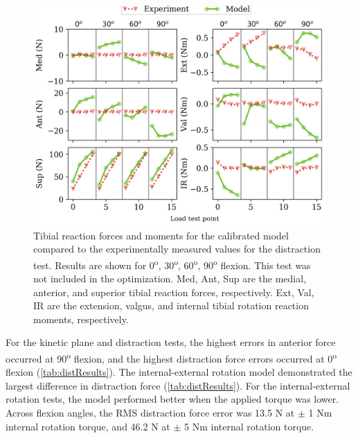 \begin{figure}
    \centering
    \includegraphics[width=0.80\linewidth]{../img/Spec1_Dist_OptimizationResults_APVV_0_30_60_90.png}
    \caption{Tibial reaction forces and moments for the calibrated model compared to the experimentally measured values for the distraction test. Results are shown for 0\textsuperscript{o}, 30\textsuperscript{o}, 60\textsuperscript{o}, 90\textsuperscript{o} flexion. This test was not included in the optimization. Med, Ant, Sup are the medial, anterior, and superior tibial reaction forces, respectively. Ext, Val, IR are the extension, valgus, and internal tibial rotation reaction moments, respectively.}
    \label{fig:resultsDistraction}
\end{figure}

For the kinetic plane and distraction tests, the highest errors in anterior force occurred at 90\textsuperscript{o} flexion, and the highest distraction force errors occurred at 0\textsuperscript{o} flexion (\autoref{tab:distResults}). The internal-external rotation model demonstrated the largest difference in distraction force (\autoref{tab:distResults}). For the internal-external rotation tests, the model performed better when the applied torque was lower. Across flexion angles, the RMS distraction force error was 13.5 N at $\pm$ 1 Nm internal rotation torque, and 46.2 N at $\pm$ 5 Nm internal rotation torque.

